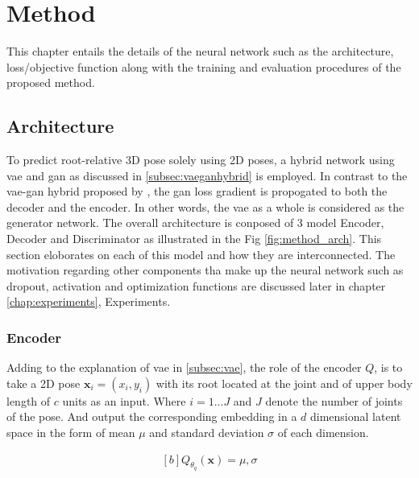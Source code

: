 \chapter{Method}
\label{chap:method}

This chapter entails the details of the neural network such as the architecture, loss/objective function along with the training and evaluation procedures of the proposed method.

\section{Architecture}
To predict root-relative 3D pose solely using 2D poses, a hybrid network using \ac{vae} and \ac{gan} as discussed in \ref{subsec:vaeganhybrid} is employed. In contrast to the \ac{vae}-\ac{gan} hybrid proposed by \cite{autoencoding_beyond_pixels}, the \ac{gan} loss gradient is propogated to both the decoder and the encoder. In other words, the \ac{vae} as a whole is considered as the generator network. The overall architecture is conposed of 3 model Encoder, Decoder and Discriminator as illustrated in the Fig \ref{fig:method_arch}. This section eloborates on each of this model and how they are interconnected. The motivation regarding other components tha make up the neural network such as dropout, activation and optimization functions are discussed later in chapter \ref{chap:experiments}, Experiments.

\subsection{Encoder}
Adding to the explanation of \ac{vae} in \ref{subsec:vae}, the role of the encoder $Q$, is to take a 2D pose $\textbf{x}_i = (x_i, y_i)$ with its root located at the joint and of upper body length of $c$ units as an input. Where $i = 1 ... J$ and $J$ denote the number of joints of the pose. And output the corresponding embedding in a $d$ dimensional latent space in the form of mean $\mu$ and standard deviation $\sigma$ of each dimension.

\begin{equation} \label{eqn:Q_fn}
    \begin{gathered}[b]
        Q_{\theta_q}(\textbf{x}) = \mu, \sigma
    \end{gathered}
\end{equation}

